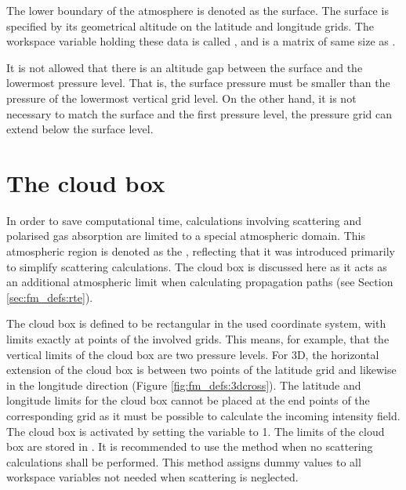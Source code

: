 The lower boundary of the atmosphere is denoted as the surface. The surface is
specified by its geometrical altitude on the latitude and longitude grids.
The workspace variable holding these data is called , and
is a matrix of same size as .

It is not allowed that there is an altitude gap between the surface and
the lowermost pressure level.  That is, the surface pressure must be
smaller than the pressure of the lowermost vertical grid level. On
the other hand, it is not necessary to match the surface and the first
pressure level, the pressure grid can extend below the surface level.


\section{The cloud box}
\label{sec:fm_defs:cloudbox}
In order to save computational time, calculations involving scattering and
polarised gas absorption are limited to a special atmospheric domain. This
atmospheric region is denoted as the , reflecting that it
was introduced primarily to simplify scattering calculations. The cloud box is
discussed here as it acts as an additional atmospheric limit when calculating
propagation paths (see Section \ref{sec:fm_defs:rte}).

The cloud box is defined to be rectangular in the used coordinate
system, with limits exactly at points of the involved grids. This
means, for example, that the vertical limits of the cloud box are two
pressure levels. For 3D, the horizontal extension of the cloud box
is between two points of the latitude grid and likewise in the
longitude direction (Figure \ref{fig:fm_defs:3dcross}). The latitude
and longitude limits for the cloud box cannot be placed at the end
points of the corresponding grid as it must be possible to calculate
the incoming intensity field. The cloud box is activated by setting
the variable  to 1.  The limits of the cloud
box are stored in .  It is recommended to
use the method  when no scattering calculations
shall be performed. This method assigns dummy values to all workspace
variables not needed when scattering is neglected.

